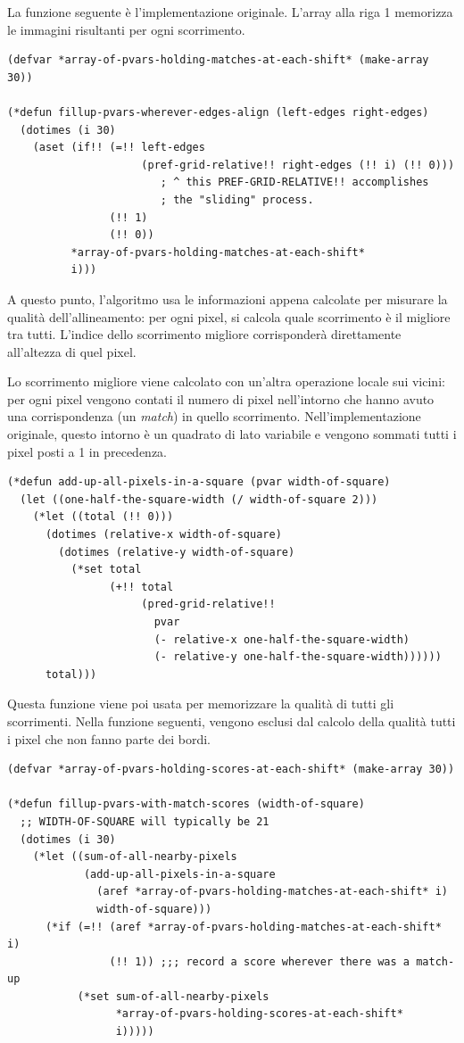 \documentclass[12pt,a4paper,openright,twoside]{report}
\begin{document}
La funzione seguente è l'implementazione originale. L'array alla riga 1 memorizza le immagini risultanti per ogni scorrimento.

\begin{lstlisting}[style=mystyle]
(defvar *array-of-pvars-holding-matches-at-each-shift* (make-array 30))

(*defun fillup-pvars-wherever-edges-align (left-edges right-edges)
  (dotimes (i 30)
    (aset (if!! (=!! left-edges
                     (pref-grid-relative!! right-edges (!! i) (!! 0)))
                        ; ^ this PREF-GRID-RELATIVE!! accomplishes
                        ; the "sliding" process.
                (!! 1)
                (!! 0))
          *array-of-pvars-holding-matches-at-each-shift*
          i)))
\end{lstlisting}

A questo punto, l'algoritmo usa le informazioni appena calcolate per misurare la qualità dell'allineamento: per ogni pixel, si calcola quale scorrimento è il migliore tra tutti. L'indice dello scorrimento migliore corrisponderà direttamente all'altezza di quel pixel.

Lo scorrimento migliore viene calcolato con un'altra operazione locale sui vicini: per ogni pixel vengono contati il numero di pixel nell'intorno che hanno avuto una corrispondenza (un \textit{match}) in quello scorrimento. Nell'implementazione originale, questo intorno è un quadrato di lato variabile e vengono sommati tutti i pixel posti a 1 in precedenza.

\begin{lstlisting}[style=mystyle]
(*defun add-up-all-pixels-in-a-square (pvar width-of-square)
  (let ((one-half-the-square-width (/ width-of-square 2)))
    (*let ((total (!! 0)))
      (dotimes (relative-x width-of-square)
        (dotimes (relative-y width-of-square)
          (*set total
                (+!! total
                     (pred-grid-relative!!
                       pvar
                       (- relative-x one-half-the-square-width)
                       (- relative-y one-half-the-square-width))))))
      total)))
\end{lstlisting}

Questa funzione viene poi usata per memorizzare la qualità di tutti gli scorrimenti. Nella funzione seguenti, vengono esclusi dal calcolo della qualità tutti i pixel che non fanno parte dei bordi.

\begin{lstlisting}[style=mystyle]
(defvar *array-of-pvars-holding-scores-at-each-shift* (make-array 30))

(*defun fillup-pvars-with-match-scores (width-of-square)
  ;; WIDTH-OF-SQUARE will typically be 21
  (dotimes (i 30)
    (*let ((sum-of-all-nearby-pixels
            (add-up-all-pixels-in-a-square
              (aref *array-of-pvars-holding-matches-at-each-shift* i)
              width-of-square)))
      (*if (=!! (aref *array-of-pvars-holding-matches-at-each-shift* i)
                (!! 1)) ;;; record a score wherever there was a match-up
           (*set sum-of-all-nearby-pixels
                 *array-of-pvars-holding-scores-at-each-shift*
                 i)))))
\end{lstlisting}
\end{document}
